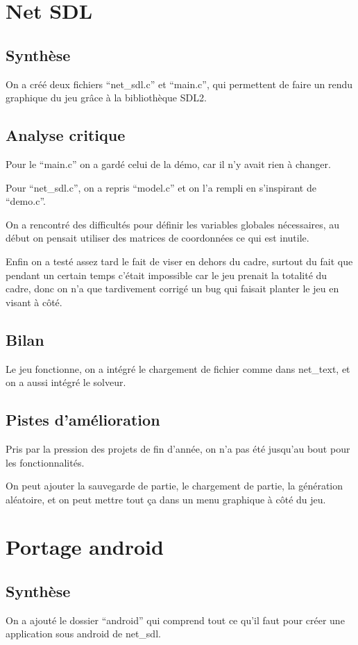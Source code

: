 \documentclass[12pt]{article}
\begin{document}
\section{Net SDL}
\subsection{Synthèse}
On a créé deux fichiers ``net\_sdl.c'' et ``main.c'', qui permettent de faire un rendu graphique du jeu grâce à la bibliothèque SDL2.
\subsection{Analyse critique}
Pour le ``main.c'' on a gardé celui de la démo, car il n'y avait rien à changer.

Pour ``net\_sdl.c'', on a repris ``model.c'' et on l'a rempli en s'inspirant de ``demo.c''.

On a rencontré des difficultés pour définir les variables globales nécessaires, au début on pensait utiliser des matrices de coordonnées ce qui est inutile.

Enfin on a testé assez tard le fait de viser en dehors du cadre, surtout du fait que pendant un certain temps c'était impossible car le jeu prenait la totalité du cadre, donc on n'a que tardivement corrigé un bug qui faisait planter le jeu en visant  à côté.
\subsection{Bilan}
Le jeu fonctionne, on a intégré le chargement de fichier comme dans net\_text, et on a aussi intégré le solveur.
\subsection{Pistes d'amélioration}
Pris par la pression des projets de fin d'année, on n'a pas été jusqu'au bout pour les fonctionnalités.

On peut ajouter la sauvegarde de partie, le chargement de partie, la génération aléatoire, et on peut mettre tout ça dans un menu graphique à côté du jeu.



\section{Portage android}
\subsection{Synthèse}
On a ajouté le dossier ``android'' qui comprend tout ce qu'il faut pour créer une application sous android de net\_sdl.
\end{document}

